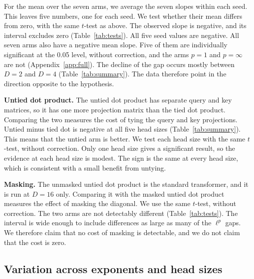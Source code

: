 \documentclass[11pt]{article}
\begin{document}
For the mean over the seven arms, we average the seven slopes within each seed.
This leaves five numbers, one for each seed.
We test whether their mean differs from zero, with the same $t$-test as above.
The observed slope is negative, and its interval excludes zero (Table~\ref{tab:tests}).
All five seed values are negative.
All seven arms also have a negative mean slope.
Five of them are individually significant at the 0.05 level, without correction, and the arms $p=1$ and $p=\infty$ are not (Appendix~\ref{app:full}).
The decline of the gap occurs mostly between $D=2$ and $D=4$ (Table~\ref{tab:summary}).
The data therefore point in the direction opposite to the hypothesis.

\begin{table}[t]
\centering\small

\caption{Slope test and masking contrast. Both rows use a one-sample $t$-test on five seed values, without correction. Per-arm slopes are in Appendix~\ref{app:full}.}
\label{tab:tests}
\end{table}

\textbf{Untied dot product.}
The untied dot product has separate query and key matrices, so it has one more projection matrix than the tied dot product.
Comparing the two measures the cost of tying the query and key projections.
Untied minus tied dot is negative at all five head sizes (Table~\ref{tab:summary}).
This means that the untied arm is better.
We test each head size with the same $t$-test, without correction.
Only one head size gives a significant result, so the evidence at each head size is modest.
The sign is the same at every head size, which is consistent with a small benefit from untying.

\textbf{Masking.}
The unmasked untied dot product is the standard transformer, and it is run at $D=16$ only.
Comparing it with the masked untied dot product measures the effect of masking the diagonal.
We use the same $t$-test, without correction.
The two arms are not detectably different (Table~\ref{tab:tests}).
The interval is wide enough to include differences as large as many of the $\ell^p$ gaps.
We therefore claim that no cost of masking is detectable, and we do not claim that the cost is zero.

\subsection{Variation across exponents and head sizes}\label{sec:flat}

\begin{table}[t]
\centering\small

\caption{Scale of the variation in final validation bpc.}
\label{tab:scale}
\end{table}
\end{document}
